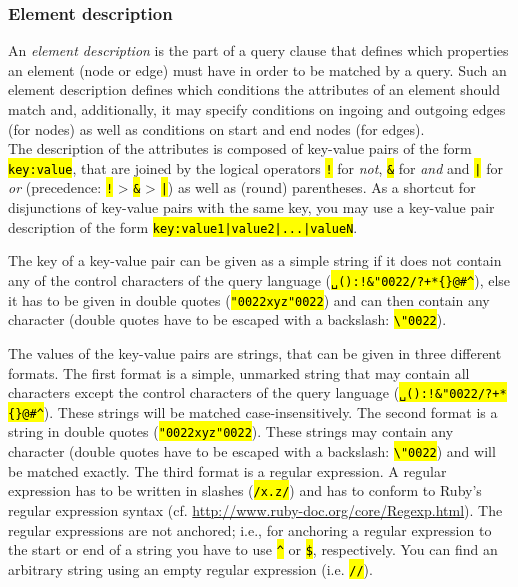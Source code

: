 \documentclass[12pt]{scrartcl}
\newcommand{\quo}{\char"0022}
\newcommand{\code}[1]{\hl{\texttt{#1}}}
\begin{document}
\subsubsection{Element description}\label{elementbeschreibung}

An \textit{element description} is the part of a query clause that defines which properties an element (node or edge) must have in order to be matched by a query.
Such an element description defines which conditions the attributes of an element should match and, additionally, it may specify conditions on ingoing and outgoing edges (for nodes) as well as conditions on start and end nodes (for edges).\\

The description of the attributes is composed of key-value pairs of the form \code{key:value}, that are joined by the logical operators \code{!} for \textit{not}, \code{\&} for \textit{and} and \code{|} for \textit{or} (precedence: \code{!} > \code{\&} > \code{|}) as well as (round) parentheses.
As a shortcut for disjunctions of key-value pairs with the same key, you may use a key-value pair description of the form \code{key:value1|value2|...|valueN}.

The key of a key-value pair can be given as a simple string if it does not contain any of the control characters of the query language (\code{␣():!\&\quo/?+*\{\}@\#\textasciicircum}), else it has to be given in double quotes (\code{{\quo}xyz\quo}) and can then contain any character (double quotes have to be escaped with a backslash: \code{\textbackslash\quo}).

\label{zeichenketten}The values of the key-value pairs are strings, that can be given in three different formats.
The first format is a simple, unmarked string that may contain all characters except the control characters of the query language (\code{␣():!\&\quo/?+*\{\}@\#\textasciicircum}).
These strings will be matched case-insensitively.
The second format is a string in double quotes (\code{{\quo}xyz\quo}).
These strings may contain any character (double quotes have to be escaped with a backslash: \code{\textbackslash\quo}) and will be matched exactly.
The third format is a regular expression.
A regular expression has to be written in slashes (\code{/x.z/}) and has to conform to Ruby’s regular expression syntax (cf. \url{http://www.ruby-doc.org/core/Regexp.html}).
The regular expressions are not anchored; i.e., for anchoring a regular expression to the start or end of a string you have to use \code{\textasciicircum} or \code{\$}, respectively.
You can find an arbitrary string using an empty regular expression (i.e. \code{//}).
\end{document}
